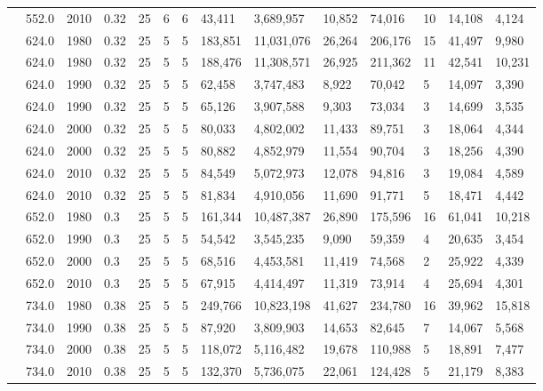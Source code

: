 \begin{table}[]
\begin{tabular}{|l|l|l|l|l|l|l|l|l|l|l|l|l|l|}
		& 552.0 & 2010 & 0.32 & 25 & 6 & 6 & 43,411 & 3,689,957 & 10,852 & 74,016 & 10 & 14,108 & 4,124 \\ \cline{2-14} 
		& 624.0 & 1980 & 0.32 & 25 & 5 & 5 & 183,851 & 11,031,076 & 26,264 & 206,176 & 15 & 41,497 & 9,980 \\ \cline{2-14} 
		& 624.0 & 1980 & 0.32 & 25 & 5 & 5 & 188,476 & 11,308,571 & 26,925 & 211,362 & 11 & 42,541 & 10,231 \\ \cline{2-14} 
		& 624.0 & 1990 & 0.32 & 25 & 5 & 5 & 62,458 & 3,747,483 & 8,922 & 70,042 & 5 & 14,097 & 3,390 \\ \cline{2-14} 
		& 624.0 & 1990 & 0.32 & 25 & 5 & 5 & 65,126 & 3,907,588 & 9,303 & 73,034 & 3 & 14,699 & 3,535 \\ \cline{2-14} 
		& 624.0 & 2000 & 0.32 & 25 & 5 & 5 & 80,033 & 4,802,002 & 11,433 & 89,751 & 3 & 18,064 & 4,344 \\ \cline{2-14} 
		& 624.0 & 2000 & 0.32 & 25 & 5 & 5 & 80,882 & 4,852,979 & 11,554 & 90,704 & 3 & 18,256 & 4,390 \\ \cline{2-14} 
		& 624.0 & 2010 & 0.32 & 25 & 5 & 5 & 84,549 & 5,072,973 & 12,078 & 94,816 & 3 & 19,084 & 4,589 \\ \cline{2-14} 
		& 624.0 & 2010 & 0.32 & 25 & 5 & 5 & 81,834 & 4,910,056 & 11,690 & 91,771 & 5 & 18,471 & 4,442 \\ \cline{2-14} 
		& 652.0 & 1980 & 0.3 & 25 & 5 & 5 & 161,344 & 10,487,387 & 26,890 & 175,596 & 16 & 61,041 & 10,218 \\ \cline{2-14} 
		& 652.0 & 1990 & 0.3 & 25 & 5 & 5 & 54,542 & 3,545,235 & 9,090 & 59,359 & 4 & 20,635 & 3,454 \\ \cline{2-14} 
		& 652.0 & 2000 & 0.3 & 25 & 5 & 5 & 68,516 & 4,453,581 & 11,419 & 74,568 & 2 & 25,922 & 4,339 \\ \cline{2-14} 
		& 652.0 & 2010 & 0.3 & 25 & 5 & 5 & 67,915 & 4,414,497 & 11,319 & 73,914 & 4 & 25,694 & 4,301 \\ \cline{2-14} 
		& 734.0 & 1980 & 0.38 & 25 & 5 & 5 & 249,766 & 10,823,198 & 41,627 & 234,780 & 16 & 39,962 & 15,818 \\ \cline{2-14} 
		& 734.0 & 1990 & 0.38 & 25 & 5 & 5 & 87,920 & 3,809,903 & 14,653 & 82,645 & 7 & 14,067 & 5,568 \\ \cline{2-14} 
		& 734.0 & 2000 & 0.38 & 25 & 5 & 5 & 118,072 & 5,116,482 & 19,678 & 110,988 & 5 & 18,891 & 7,477 \\ \cline{2-14} 
		& 734.0 & 2010 & 0.38 & 25 & 5 & 5 & 132,370 & 5,736,075 & 22,061 & 124,428 & 5 & 21,179 & 8,383 \\ \cline{2-14} 

\end{tabular}
\end{table}
